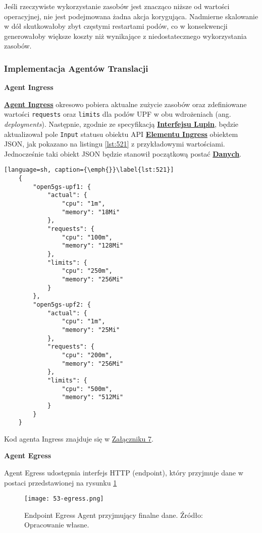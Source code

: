 Jeśli rzeczywiste wykorzystanie zasobów jest znacząco niższe od wartości operacyjnej, nie jest podejmowana żadna akcja korygująca. Nadmierne skalowanie w dół skutkowałoby zbyt częstymi restartami podów, co w konsekwencji generowałoby większe koszty niż wynikające z niedostatecznego wykorzystania zasobów.

\subsubsection{Implementacja Agentów Translacji}

\textbf{Agent Ingress}

\hyperlink{def:agent-ingress}{\textbf{Agent Ingress}} okresowo pobiera aktualne zużycie zasobów oraz zdefiniowane wartości \texttt{requests} oraz \texttt{limits} dla podów UPF w obu wdrożeniach (ang. \textit{deployments}). Następnie, zgodnie ze specyfikacją \hyperlink{def:interfejs-lupin}{\textbf{Interfejsu Lupin}}, będzie aktualizował pole \texttt{Input} statusu obiektu API \hyperlink{def:element-ingres}{\textbf{Elementu Ingress}} obiektem JSON, jak pokazano na listingu \ref{lst:521} z przykładowymi wartościami. Jednocześnie taki obiekt JSON będzie stanowił początkową postać \hyperlink{def:dane}{\textbf{Danych}}.

\begin{lstlisting}[language=sh, caption={\emph{}}\label{lst:521}]
    {
        "open5gs-upf1: {
            "actual": {
                "cpu": "1m",
                "memory": "18Mi"
            },
            "requests": {
                "cpu": "100m",
                "memory": "128Mi"
            },
            "limits": {
                "cpu": "250m",
                "memory": "256Mi"
            }
        },
        "open5gs-upf2: {
            "actual": {
                "cpu": "1m",
                "memory": "25Mi"
            },
            "requests": {
                "cpu": "200m",
                "memory": "256Mi"
            },
            "limits": {
                "cpu": "500m",
                "memory": "512Mi"
            }
        }
    }
\end{lstlisting}

Kod agenta Ingress znajduje się w \hyperlink{appengix:7}{Załączniku 7}.

\textbf{Agent Egress}

Agent Egress udostępnia interfejs HTTP (endpoint), który przyjmuje dane w postaci przedstawionej na rysunku \ref{fig:53-egress}

\begin{figure}[!h]
    \centering \texttt{[image: 53-egress.png]}
    \caption{Endpoint Egress Agent przyjmujący finalne dane. Źródło: Opracowanie własne.}\label{fig:53-egress}
\end{figure}

